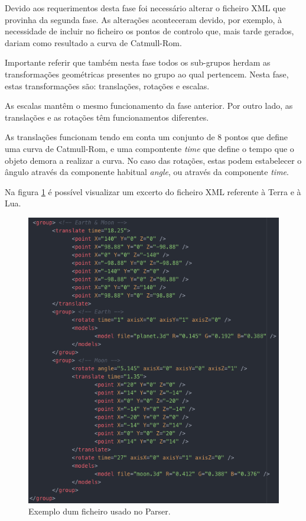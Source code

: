 \documentclass[a4paper]{article}
\begin{document}
Devido aos requerimentos desta fase foi necessário alterar o ficheiro XML que provinha da segunda fase. As alterações aconteceram devido, por exemplo, à necessidade de incluir no ficheiro os pontos de controlo que, mais tarde gerados, dariam como resultado a curva de Catmull-Rom.

Importante referir que também nesta fase todos os sub-grupos herdam as transformações geométricas presentes no grupo ao qual pertencem. Nesta fase, estas transformações são: translações, rotações e escalas.

As escalas mantêm o mesmo funcionamento da fase anterior. Por outro lado, as translações e as rotações têm funcionamentos diferentes.

As translações funcionam tendo em conta um conjunto de 8 pontos que define uma curva de Catmull-Rom, e uma compontente \textit{time} que define o tempo que o objeto demora a realizar a curva. No caso das rotações, estas podem estabelecer o ângulo através da componente habitual \textit{angle}, ou através da componente \textit{time}.

Na figura \ref{img:ficheiro_parser} é possível visualizar um excerto do ficheiro XML referente à Terra e à Lua.

\begin{figure}[H]
\centering
\includegraphics[scale=0.50]{ficheiro_parser.png}
\caption{Exemplo dum ficheiro usado no Parser.}
\label{img:ficheiro_parser}
\end{figure}
\end{document}
